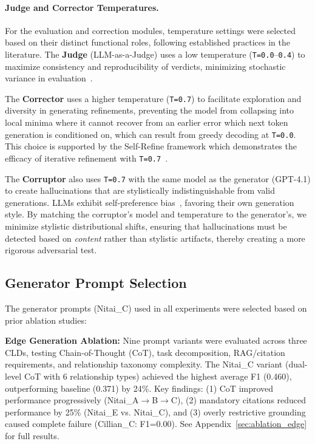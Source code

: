 \paragraph{Judge and Corrector Temperatures.}
For the evaluation and correction modules, temperature settings were selected based on their distinct functional roles, following established practices in the literature. The \textbf{Judge} (LLM-as-a-Judge) uses a low temperature (\texttt{T=0.0}--\texttt{0.4}) to maximize consistency and reproducibility of verdicts, minimizing stochastic variance in evaluation~\citep{liu2023gevalnlgevaluationusing, zheng2024judging}.

The \textbf{Corrector} uses a higher temperature (\texttt{T=0.7}) to facilitate exploration and diversity in generating refinements, preventing the model from collapsing into local minima where it cannot recover from an earlier error which next token generation is conditioned on, which can result from greedy decoding at \texttt{T=0.0}. This choice is supported by the Self-Refine framework which demonstrates the efficacy of iterative refinement with \texttt{T=0.7}~\citep{madaan2023selfrefineiterativerefinementselffeedback}.

The \textbf{Corruptor} also uses \texttt{T=0.7} with the same model as the generator (GPT-4.1) to create hallucinations that are stylistically indistinguishable from valid generations. LLMs exhibit self-preference bias~\citep{zheng2024judging}, favoring their own generation style. By matching the corruptor's model and temperature to the generator's, we minimize stylistic distributional shifts, ensuring that hallucinations must be detected based on \textit{content} rather than stylistic artifacts, thereby creating a more rigorous adversarial test.

\subsection{Generator Prompt Selection}

The generator prompts (Nitai\_C) used in all experiments were selected based on prior ablation studies:

\textbf{Edge Generation Ablation:} Nine prompt variants were evaluated across three CLDs, testing Chain-of-Thought (CoT), task decomposition, RAG/citation requirements, and relationship taxonomy complexity. The Nitai\_C variant (dual-level CoT with 6 relationship types) achieved the highest average F1 (0.460), outperforming baseline (0.371) by 24\%. Key findings: (1) CoT improved performance progressively (Nitai\_A$\rightarrow$B$\rightarrow$C), (2) mandatory citations reduced performance by 25\% (Nitai\_E vs. Nitai\_C), and (3) overly restrictive grounding caused complete failure (Cillian\_C: F1=0.00). See Appendix~\ref{sec:ablation_edge} for full results.

